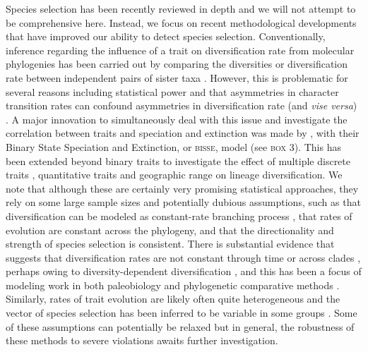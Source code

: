 Species selection has been recently reviewed in depth \citep{Jablonski2008, RaboskyMcCune2010} and we will not attempt to be comprehensive here. Instead, we focus on recent methodological developments that have improved our ability to detect species selection. Conventionally, inference regarding the influence of a trait on diversification rate from molecular phylogenies has been carried out by comparing the diversities or diversification rate between independent pairs of sister taxa \citep{Mitter1988, Sargent2004, Vamosi2004, RaboskyMcCune2010}. However, this is problematic for several reasons including statistical power \citep{Slowinski1989, Slowinski1993, VamosiVamosi} and that asymmetries in character transition rates can confound asymmetries in diversification rate (and \emph{vise versa}) \citep{Maddison2006}. A major innovation to simultaneously deal with this issue and investigate the correlation between traits and speciation and extinction was made by \citet{Maddison2007}, with their Binary State Speciation and Extinction, or \textsc{bisse}, model (see \textsc{box 3}). This has been extended beyond binary traits to investigate the effect of multiple discrete traits \citep[\textsc{musse};][]{FitzJohn2012}, quantitative traits \citep[\textsc{quasse};][]{FitzJohn2010} and geographic range \citep[\textsc{geosse};][]{Goldberg2011} on lineage diversification. We note that although these are certainly very promising statistical approaches, they rely on some large sample sizes and potentially dubious assumptions, such as that diversification can be modeled as constant-rate branching process \citep[i.e., a ``birth-death'' model;][]{Kendall1948}, that rates of evolution are constant across the phylogeny, and that the directionality and strength of species selection is consistent. There is substantial evidence that suggests that diversification rates are not constant through time or across clades \citep{Rabosky2007, McPeek2008, PhillimorePrice2008, Alfaro2009, Rabosky2012, Rabosky2013}, perhaps owing to diversity-dependent diversification \citep{Sepkoski1984, Alroy2008, Rabosky2009}, and this has been a focus of modeling work in both paleobiology \citep{Roy1996,  Eble2000, Sepkoski2000} and phylogenetic comparative methods \citep{Rabosky2008, Etienne2012, Etienne2012AmNat}. Similarly, rates of trait evolution are likely often quite heterogeneous \citep{Eastman2011, Beaulieu2013} and the vector of species selection has been inferred to be variable in some groups \citep{Jablonski1986, Simpson2010, Harnik2012}. Some of these assumptions can potentially be relaxed \citep{RaboskyGlor2010} but in general, the robustness of these methods to severe violations awaits further investigation.

